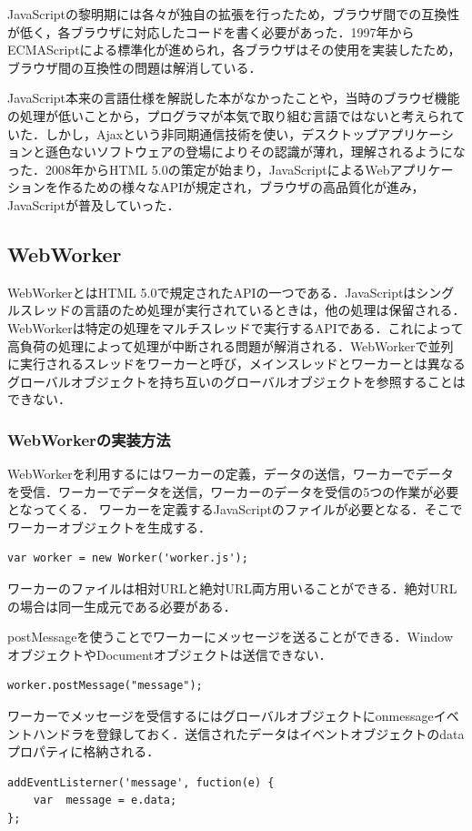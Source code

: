 \documentclass[a4j,12pt]{jsarticle}
\begin{document}
JavaScriptの黎明期には各々が独自の拡張を行ったため，ブラウザ間での互換性が低く，各ブラウザに対応したコードを書く必要があった．1997年からECMAScriptによる標準化が進められ，各ブラウザはその使用を実装したため，ブラウザ間の互換性の問題は解消している．

JavaScript本来の言語仕様を解説した本がなかったことや，当時のブラウゼ機能の処理が低いことから，プログラマが本気で取り組む言語ではないと考えられていた．しかし，Ajaxという非同期通信技術を使い，デスクトップアプリケーションと遜色ないソフトウェアの登場によりその認識が薄れ，理解されるようになった．2008年からHTML 5.0の策定が始まり，JavaScriptによるWebアプリケーションを作るための様々なAPIが規定され，ブラウザの高品質化が進み，JavaScriptが普及していった．

\subsection{WebWorker}
WebWorkerとはHTML 5.0で規定されたAPIの一つである．JavaScriptはシングルスレッドの言語のため処理が実行されているときは，他の処理は保留される．WebWorkerは特定の処理をマルチスレッドで実行するAPIである．これによって高負荷の処理によって処理が中断される問題が解消される．WebWorkerで並列に実行されるスレッドをワーカーと呼び，メインスレッドとワーカーとは異なるグローバルオブジェクトを持ち互いのグローバルオブジェクトを参照することはできない．

\subsubsection{WebWorkerの実装方法}
WebWorkerを利用するにはワーカーの定義，データの送信，ワーカーでデータを受信．ワーカーでデータを送信，ワーカーのデータを受信の5つの作業が必要となってくる．
ワーカーを定義するJavaScriptのファイルが必要となる．そこでワーカーオブジェクトを生成する．
\begin{lstlisting}[basicstyle=\ttfamily\footnotesize, frame=single]
var worker = new Worker('worker.js');
 \end{lstlisting}
ワーカーのファイルは相対URLと絶対URL両方用いることができる．絶対URLの場合は同一生成元である必要がある．


postMessageを使うことでワーカーにメッセージを送ることができる．WindowオブジェクトやDocumentオブジェクトは送信できない．
\begin{lstlisting}[basicstyle=\ttfamily\footnotesize, frame=single]
worker.postMessage("message");
 \end{lstlisting}

ワーカーでメッセージを受信するにはグローバルオブジェクトにonmessageイベントハンドラを登録しておく．送信されたデータはイベントオブジェクトのdataプロパティに格納される．
\begin{lstlisting}[basicstyle=\ttfamily\footnotesize, frame=single]
addEventListerner('message', fuction(e) { 
	var  message = e.data;
};
 \end{lstlisting}
\end{document}
